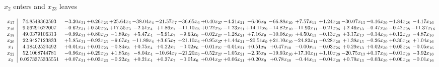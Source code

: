 \documentclass[9pt]{article}
\begin{document}
 $ x_{2} $ enters and $ x_{23} $ leaves 

 \[\begin{array}{c| c c@{\hskip 2pt} c@{\hskip 2pt} c@{\hskip 2pt} c@{\hskip 2pt} c@{\hskip 2pt} c@{\hskip 2pt} c@{\hskip 2pt} c@{\hskip 2pt} c@{\hskip 2pt} c@{\hskip 2pt} c@{\hskip 2pt} c@{\hskip 2pt} c@{\hskip 2pt} c@{\hskip 2pt} c@{\hskip 2pt} c@{\hskip 2pt} }
 x_{17}   &  74.8549362593 & -3.20 x_{31} & +  0.26 x_{23} & + 25.64 x_{3} & -38.04 x_{4} & -21.57 x_{7} & -36.65 x_{6} & +  0.40 x_{27} & -4.21 x_{21} & -6.06 x_{9} & -66.88 x_{10} & +  7.57 x_{11} & +  1.24 x_{26} & -30.07 x_{13} & -0.16 x_{30} & -1.84 x_{28} & -4.17 x_{16}\\
 x_{18}   &  9.56291622007 & -0.62 x_{31} & +  0.50 x_{23} & + 17.55 x_{3} & -2.51 x_{4} & +  1.86 x_{7} & -11.10 x_{6} & +  0.22 x_{27} & -1.23 x_{21} & + 14.11 x_{9} & -14.82 x_{10} & -11.93 x_{11} & -0.21 x_{26} & +  2.46 x_{13} & -0.47 x_{30} & -0.42 x_{28} & -11.37 x_{16}\\
 x_{19}   &  49.0379106313 & -0.99 x_{31} & +  0.80 x_{23} & -1.89 x_{3} & +  5.47 x_{4} & -5.91 x_{7} & -9.63 x_{6} & -0.02 x_{27} & -1.28 x_{21} & +  7.16 x_{9} & -10.08 x_{10} & +  4.50 x_{11} & -0.13 x_{26} & +  3.17 x_{13} & -0.14 x_{30} & +  0.12 x_{28} & -4.87 x_{16}\\
 x_{20}   &  22.9427123833 & +  1.85 x_{31} & -0.93 x_{23} & -9.67 x_{3} & -11.89 x_{4} & +  3.65 x_{7} & + 21.10 x_{6} & +  0.95 x_{27} & +  1.44 x_{21} & -20.51 x_{9} & + 21.10 x_{10} & -24.82 x_{11} & -0.28 x_{26} & +  1.38 x_{13} & -0.26 x_{30} & +  0.30 x_{28} & +  1.04 x_{16}\\
 x_{1}   &  4.18402520492 & +  0.01 x_{31} & +  0.01 x_{23} & -0.84 x_{3} & +  0.75 x_{4} & +  0.22 x_{7} & -0.02 x_{6} & -0.01 x_{27} & -0.01 x_{21} & +  0.51 x_{9} & +  0.47 x_{10} & -0.00 x_{11} & -0.03 x_{26} & +  0.29 x_{13} & +  0.02 x_{30} & +  0.05 x_{28} & -0.05 x_{16}\\
 x_{22}   &  52.1068744781 & -0.96 x_{31} & +  0.29 x_{23} & +  1.85 x_{3} & -8.04 x_{4} & -10.64 x_{7} & -21.20 x_{6} & -0.52 x_{27} & -1.05 x_{21} & -2.35 x_{9} & -19.93 x_{10} & + 17.10 x_{11} & +  1.10 x_{26} & -20.75 x_{13} & +  0.17 x_{30} & -0.01 x_{28} & -3.92 x_{16}\\
 x_{5}   &  0.0273375335551 & +  0.07 x_{31} & +  0.03 x_{23} & -0.22 x_{3} & +  0.21 x_{4} & +  0.37 x_{7} & -0.01 x_{6} & +  0.04 x_{27} & +  0.06 x_{21} & +  0.20 x_{9} & +  0.78 x_{10} & -0.44 x_{11} & -0.04 x_{26} & +  0.79 x_{13} & -0.03 x_{30} & +  0.06 x_{28} & -0.01 x_{16}\\

\end{array}\]
\end{document}
